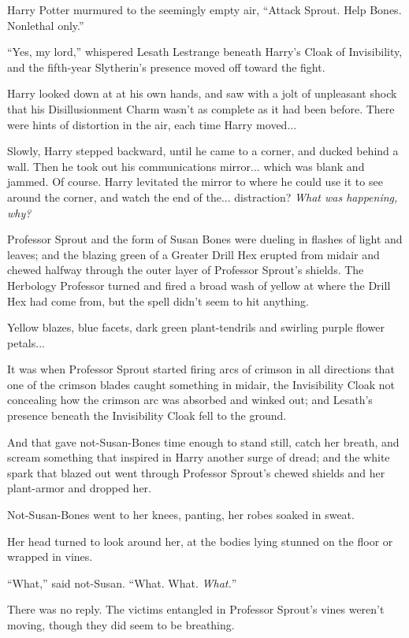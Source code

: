 Harry Potter murmured to the seemingly empty air, ``Attack Sprout. Help Bones. Nonlethal only.''

``Yes, my lord,'' whispered Lesath Lestrange beneath Harry's Cloak of Invisibility, and the fifth-year Slytherin's presence moved off toward the fight.

Harry looked down at at his own hands, and saw with a jolt of unpleasant shock that his Disillusionment Charm wasn't as complete as it had been before. There were hints of distortion in the air, each time Harry moved...

Slowly, Harry stepped backward, until he came to a corner, and ducked behind a wall. Then he took out his communications mirror... which was blank and jammed. Of course. Harry levitated the mirror to where he could use it to see around the corner, and watch the end of the... distraction? \emph{What was happening, why?}

Professor Sprout and the form of Susan Bones were dueling in flashes of light and leaves; and the blazing green of a Greater Drill Hex erupted from midair and chewed halfway through the outer layer of Professor Sprout's shields. The Herbology Professor turned and fired a broad wash of yellow at where the Drill Hex had come from, but the spell didn't seem to hit anything.

Yellow blazes, blue facets, dark green plant-tendrils and swirling purple flower petals...

It was when Professor Sprout started firing arcs of crimson in all directions that one of the crimson blades caught something in midair, the Invisibility Cloak not concealing how the crimson arc was absorbed and winked out; and Lesath's presence beneath the Invisibility Cloak fell to the ground.

And that gave not-Susan-Bones time enough to stand still, catch her breath, and scream something that inspired in Harry another surge of dread; and the white spark that blazed out went through Professor Sprout's chewed shields and her plant-armor and dropped her.

Not-Susan-Bones went to her knees, panting, her robes soaked in sweat.

Her head turned to look around her, at the bodies lying stunned on the floor or wrapped in vines.

``What,'' said not-Susan. ``What. What. \emph{What.}''

There was no reply. The victims entangled in Professor Sprout's vines weren't moving, though they did seem to be breathing.

